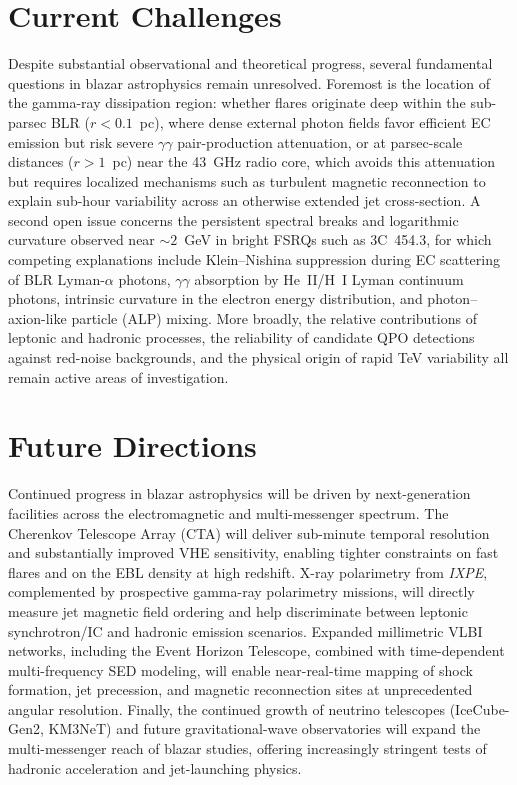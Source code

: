 \documentclass[11pt]{article}
\begin{document}
\section{Current Challenges}

Despite substantial observational and theoretical progress, several fundamental questions in blazar astrophysics remain unresolved. Foremost is the location of the gamma-ray dissipation region: whether flares originate deep within the sub-parsec BLR ($r < 0.1$~pc), where dense external photon fields favor efficient EC emission but risk severe $\gamma\gamma$ pair-production attenuation, or at parsec-scale distances ($r > 1$~pc) near the 43~GHz radio core, which avoids this attenuation but requires localized mechanisms such as turbulent magnetic reconnection to explain sub-hour variability across an otherwise extended jet cross-section. A second open issue concerns the persistent spectral breaks and logarithmic curvature observed near $\sim 2$~GeV in bright FSRQs such as 3C~454.3, for which competing explanations include Klein--Nishina suppression during EC scattering of BLR Lyman-$\alpha$ photons, $\gamma\gamma$ absorption by He~II/H~I Lyman continuum photons, intrinsic curvature in the electron energy distribution, and photon--axion-like particle (ALP) mixing. More broadly, the relative contributions of leptonic and hadronic processes, the reliability of candidate QPO detections against red-noise backgrounds, and the physical origin of rapid TeV variability all remain active areas of investigation.

\section{Future Directions}

Continued progress in blazar astrophysics will be driven by next-generation facilities across the electromagnetic and multi-messenger spectrum. The Cherenkov Telescope Array (CTA) will deliver sub-minute temporal resolution and substantially improved VHE sensitivity, enabling tighter constraints on fast flares and on the EBL density at high redshift. X-ray polarimetry from \textit{IXPE}, complemented by prospective gamma-ray polarimetry missions, will directly measure jet magnetic field ordering and help discriminate between leptonic synchrotron/IC and hadronic emission scenarios. Expanded millimetric VLBI networks, including the Event Horizon Telescope, combined with time-dependent multi-frequency SED modeling, will enable near-real-time mapping of shock formation, jet precession, and magnetic reconnection sites at unprecedented angular resolution. Finally, the continued growth of neutrino telescopes (IceCube-Gen2, KM3NeT) and future gravitational-wave observatories will expand the multi-messenger reach of blazar studies, offering increasingly stringent tests of hadronic acceleration and jet-launching physics.
\end{document}
